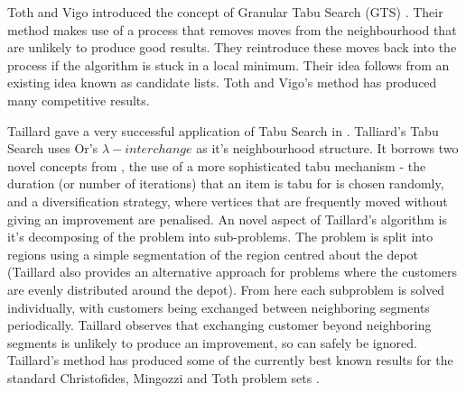 Toth and Vigo introduced the concept of Granular Tabu Search (GTS) \cite{GHL:1998}. Their method makes use of a process that removes moves from the neighbourhood that are unlikely to produce good results. They reintroduce these moves back into the process if the algorithm is stuck in a local minimum. Their idea follows from an existing idea known as candidate lists. Toth and Vigo's method has produced many competitive results.

Taillard gave a very successful application of Tabu Search in \cite{Taillard:1993}. Talliard's Tabu Search uses Or's $\lambda-interchange$ as it's neighbourhood structure. It borrows two novel concepts from \cite{GHL:1994}, the use of a more sophisticated tabu mechanism - the duration (or number of iterations) that an item is tabu for is chosen randomly, and a diversification strategy, where vertices that are frequently moved without giving an improvement are penalised. An novel aspect of Taillard's algorithm is it's decomposing of the problem into sub-problems. The problem is split into regions using a simple segmentation of the region centred about the depot (Taillard also provides an alternative approach for problems where the customers are evenly distributed around the depot). From here each subproblem is solved individually, with customers being exchanged between neighboring segments periodically. Taillard observes that exchanging customer beyond neighboring segments is unlikely to produce an improvement, so can safely be ignored. Taillard's method has produced some of the currently best known results for the standard Christofides, Mingozzi and Toth problem sets \cite{CMT:1981}. 



% 




